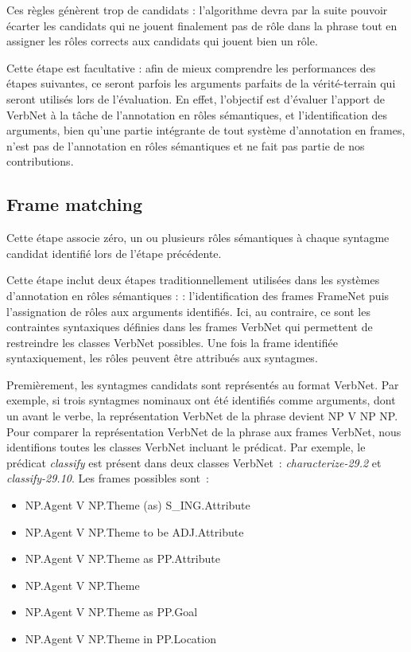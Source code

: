 
Ces règles génèrent trop de candidats : l'algorithme devra par la suite pouvoir
écarter les candidats qui ne jouent finalement pas de rôle dans la phrase tout
en assigner les rôles corrects aux candidats qui jouent bien un rôle.

Cette étape est facultative : afin de mieux comprendre les performances des
étapes suivantes, ce seront parfois les arguments parfaits de la vérité-terrain
qui seront utilisés lors de l'évaluation. En effet, l'objectif est d'évaluer
l'apport de VerbNet à la tâche de l'annotation en rôles sémantiques, et
l'identification des arguments, bien qu'une partie intégrante de tout système
d'annotation en frames, n'est pas de l'annotation en rôles sémantiques
\citep{das2010probabilistic} et ne fait pas partie de nos contributions.

\subsection{Frame matching}

Cette étape associe zéro, un ou plusieurs rôles sémantiques à chaque syntagme
candidat identifié lors de l'étape précédente.

Cette étape inclut deux étapes traditionnellement utilisées dans les systèmes
d'annotation en rôles sémantiques : \citep{gildea2002automatic,das2014frame} :
l'identification des frames FrameNet puis l'assignation de rôles aux arguments
identifiés. Ici, au contraire, ce sont les contraintes syntaxiques définies
dans les frames VerbNet qui permettent de restreindre les classes VerbNet
possibles. Une fois la frame identifiée syntaxiquement, les rôles peuvent être
attribués aux syntagmes.

Premièrement, les syntagmes candidats sont représentés au format VerbNet. Par
exemple, si trois syntagmes nominaux ont été identifiés comme arguments, dont
un avant le verbe, la représentation VerbNet de la phrase devient NP V NP NP.
Pour comparer la représentation VerbNet de la phrase aux frames VerbNet, nous
identifions toutes les classes VerbNet incluant le prédicat. Par exemple, le
prédicat \emph{classify} est présent dans deux classes VerbNet~:
\emph{characterize-29.2} et \emph{classify-29.10}. Les frames possibles
sont~:

\begin{itemize}
    \item NP.Agent V NP.Theme (as) S\_ING.Attribute
    \item NP.Agent V NP.Theme to be ADJ.Attribute
    \item NP.Agent V NP.Theme as PP.Attribute
    \item NP.Agent V NP.Theme
    \item NP.Agent V NP.Theme as PP.Goal
    \item NP.Agent V NP.Theme in PP.Location
\end{itemize}

